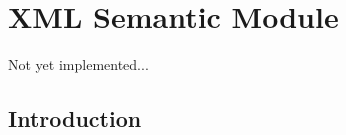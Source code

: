 \chapter{XML Semantic Module}

\begin{implnote}
Not yet implemented...
\end{implnote}

\section{Introduction}

\section{}

\section{}

\section{}

\section{}
